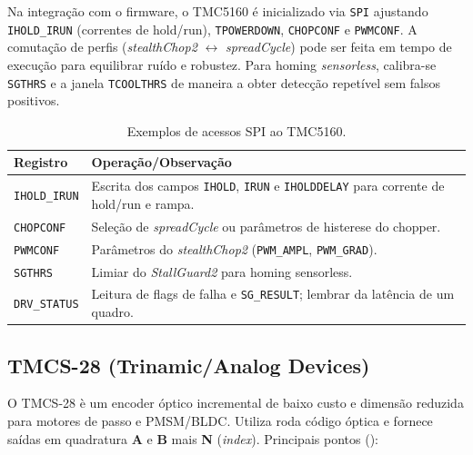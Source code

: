 Na integra\c{c}\~ao com o firmware, o TMC5160 \'e inicializado via \texttt{SPI}
ajustando \texttt{IHOLD\_IRUN} (correntes de hold/run), \texttt{TPOWERDOWN},
\texttt{CHOPCONF} e \texttt{PWMCONF}. A comuta\c{c}\~ao de perfis (\textit{stealthChop2}
\(\leftrightarrow\) \textit{spreadCycle}) pode ser feita em tempo de execu\c{c}\~ao
para equilibrar ru\'ido e robustez. Para homing \emph{sensorless}, calibra-se
\texttt{SGTHRS} e a janela \texttt{TCOOLTHRS} de maneira a obter detec\c{c}\~ao
repet\'ivel sem falsos positivos.

\noindent\label{sec:tmc5160-examples}
\begin{table}[H]
  \centering
  \caption{Exemplos de acessos SPI ao TMC5160.}
  \label{tab:tmc5160-examples}
  \setlength{\tabcolsep}{4pt}\footnotesize
  \begin{tabularx}{\textwidth}{lX}
    \toprule
    Registro & Opera\c{c}\~ao/Observa\c{c}\~ao \\
    \midrule
    \texttt{IHOLD\_IRUN} & Escrita dos campos \texttt{IHOLD}, \texttt{IRUN} e \texttt{IHOLDDELAY} para corrente de hold/run e rampa. \\
    \texttt{CHOPCONF} & Sele\c{c}\~ao de \emph{spreadCycle} ou par\^ametros de histerese do chopper. \\
    \texttt{PWMCONF} & Par\^ametros do \emph{stealthChop2} (\texttt{PWM\_AMPL}, \texttt{PWM\_GRAD}). \\
    \texttt{SGTHRS} & Limiar do \emph{StallGuard2} para homing sensorless. \\
    \texttt{DRV\_STATUS} & Leitura de flags de falha e \texttt{SG\_RESULT}; lembrar da lat\^encia de um quadro. \\
    \bottomrule
  \end{tabularx}
\end{table}

\FloatBarrier
\subsection{TMCS-28 (Trinamic/Analog Devices)}

O TMCS-28 \`e um encoder \'{o}ptico incremental de baixo custo e dimens\~ao
reduzida para motores de passo e PMSM/BLDC. Utiliza roda c\'odigo \'{o}ptica
e fornece sa\'idas em quadratura \textbf{A} e \textbf{B} mais \textbf{N}
(\emph{index}). Principais pontos (\cite{tmcs28_datasheet}):


